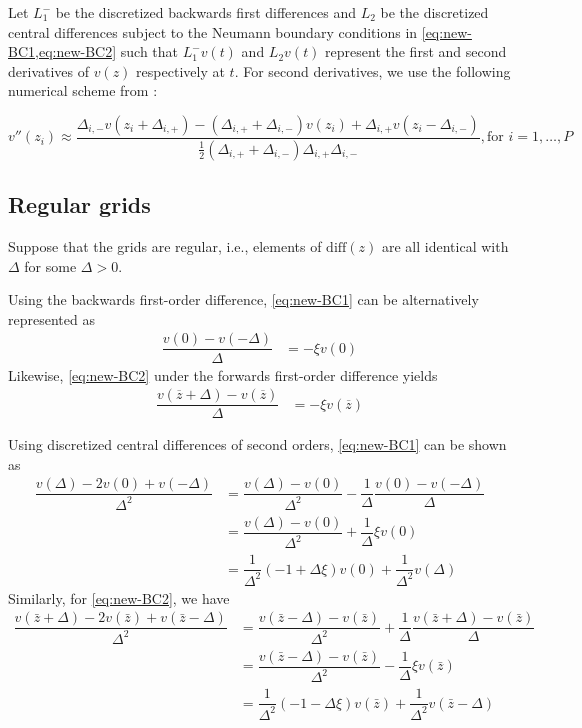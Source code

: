 \documentclass[11pt]{article}
\begin{document}
Let $L_1^{-}$ be the discretized backwards first differences and $L_2$ be the discretized central differences subject to the Neumann boundary conditions in \cref{eq:new-BC1,eq:new-BC2} such that $L_1^{-} v(t)$ and $L_2 v(t)$ represent the first and second derivatives of $v(z)$ respectively at $t$. For second derivatives, we use the following numerical scheme from \cite{achdou17}:

\begin{equation}
v''(z_i) \approx \dfrac{ \Delta_{i,-} v( z_i + \Delta_{i,+}) - (\Delta_{i,+} + \Delta_{i,-}) v( z_i ) + \Delta_{i,+} v( z_i - \Delta_{i,-})}{\frac{1}{2}(\Delta_{i,+} + \Delta_{i,-}) \Delta_{i,+} \Delta_{i,-} }, \text{for } i = 1, \ldots, P
\end{equation}





\subsection{Regular grids}
Suppose that the grids are regular, i.e., elements of $\text{diff}(z)$ are all identical with $\Delta$ for some $\Delta > 0$.

Using the backwards first-order difference, \eqref{eq:new-BC1} can be alternatively represented as
\begin{align}
\dfrac{v(0) - v(-\Delta)}{\Delta} &= - \xi v(0)
\end{align}
Likewise, \eqref{eq:new-BC2} under the forwards first-order difference yields
\begin{align}
\dfrac{v(\overline{z} + \Delta) - v(\overline{z})}{\Delta} &= - \xi v(\overline{z})
\end{align}

Using discretized central differences of second orders, \eqref{eq:new-BC1} can be shown as
\begin{align}
\dfrac{v (\Delta) - 2 v(0) + v(-\Delta)}{\Delta^2} &=   \dfrac{v(\Delta) - v(0)}{\Delta^2} - \dfrac{1}{\Delta}\dfrac{v (0) - v(-\Delta) }{\Delta}  \\
&= \dfrac{v(\Delta) - v(0)}{\Delta^2} + \dfrac{1}{\Delta} \xi v(0)  \\ 
&= \dfrac{1}{\Delta^2}  (- 1 + \Delta \xi) v(0)  + \dfrac{1}{\Delta^2}  v(\Delta)  
\end{align}
Similarly, for \eqref{eq:new-BC2}, we have
\begin{align}
\dfrac{v (\bar{z} + \Delta) - 2 v(\bar{z} ) + v(\bar{z} -\Delta)}{\Delta^2} &=   \dfrac{v(\bar{z} - \Delta) - v(\bar{z})}{\Delta^2} + \dfrac{1}{\Delta}\dfrac{ v(\bar{z}+\Delta) - v (\bar{z}) }{\Delta}  \\
&= \dfrac{v(\bar{z} - \Delta) - v(\bar{z})}{\Delta^2}  - \dfrac{1}{\Delta} \xi v(\bar{z})  \\ 
&= \dfrac{1}{\Delta^2}  (- 1 - \Delta \xi) v(\bar{z})  + \dfrac{1}{\Delta^2}  v(\bar{z} - \Delta)  
\end{align}
\end{document}
